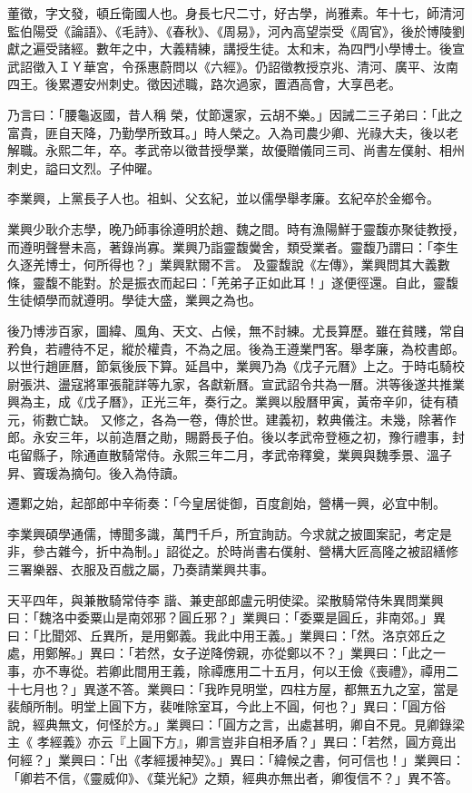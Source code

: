 \begin{pinyinscope}
 董徵，字文發，頓丘衛國人也。身長七尺二寸，好古學，尚雅素。年十七，師清河監伯陽受《論語》、《毛詩》、《春秋》、《周易》，河內高望崇受《周官》，後於博陵劉獻之遍受諸經。數年之中，大義精練，講授生徒。太和末，為四門小學博士。後宣武詔徵入ＩＹ華宮，令孫惠蔚問以《六經》。仍詔徵教授京兆、清河、廣平、汝南四王。後累遷安州刺史。徵因述職，路次過家，置酒高會，大享邑老。



 乃言曰：「腰龜返國，昔人稱
 榮，仗節還家，云胡不樂。」因誡二三子弟曰：「此之富貴，匪自天降，乃勤學所致耳。」時人榮之。入為司農少卿、光祿大夫，後以老解職。永熙二年，卒。孝武帝以徵昔授學業，故優贈儀同三司、尚書左僕射、相州刺史，謚曰文烈。子仲曜。



 李業興，上黨長子人也。祖虯、父玄紀，並以儒學舉孝廉。玄紀卒於金鄉令。



 業興少耿介志學，晚乃師事徐遵明於趙、魏之間。時有漁陽鮮于靈馥亦聚徒教授，而遵明聲譽未高，著錄尚寡。業興乃詣靈馥黌舍，類受業者。靈馥乃謂曰：「李生久逐羌博士，何所得也？」業興默爾不言。
 及靈馥說《左傳》，業興問其大義數條，靈馥不能對。於是振衣而起曰：「羌弟子正如此耳！」遂便徑還。自此，靈馥生徒傾學而就遵明。學徒大盛，業興之為也。



 後乃博涉百家，圖緯、風角、天文、占候，無不討練。尤長算歷。雖在貧賤，常自矜負，若禮待不足，縱於權貴，不為之屈。後為王遵業門客。舉孝廉，為校書郎。以世行趙匪曆，節氣後辰下算。延昌中，業興乃為《戊子元曆》上之。于時屯騎校尉張洪、盪寇將軍張龍詳等九家，各獻新曆。宣武詔令共為一曆。洪等後遂共推業興為主，成《戊子曆》，正光三年，奏行之。業興以殷曆甲寅，黃帝辛卯，徒有積元，術數亡缺。
 又修之，各為一卷，傳於世。建義初，敕典儀注。未幾，除著作郎。永安三年，以前造曆之勛，賜爵長子伯。後以孝武帝登極之初，豫行禮事，封屯留縣子，除通直散騎常侍。永熙三年二月，孝武帝釋奠，業興與魏季景、溫子昇、竇瑗為摘句。後入為侍讀。



 遷鄴之始，起部郎中辛術奏：「今皇居徙御，百度創始，營構一興，必宜中制。



 李業興碩學通儒，博聞多識，萬門千戶，所宜詢訪。今求就之披圖案記，考定是非，參古雜今，折中為制。」詔從之。於時尚書右僕射、營構大匠高隆之被詔繕修三署樂器、衣服及百戲之屬，乃奏請業興共事。



 天平四年，與兼散騎常侍李
 諧、兼吏部郎盧元明使梁。梁散騎常侍朱異問業興曰：「魏洛中委粟山是南郊邪？圓丘邪？」業興曰：「委粟是圓丘，非南郊。」異曰：「比聞郊、丘異所，是用鄭義。我此中用王義。」業興曰：「然。洛京郊丘之處，用鄭解。」異曰：「若然，女子逆降傍親，亦從鄭以不？」業興曰：「此之一事，亦不專從。若卿此間用王義，除禫應用二十五月，何以王儉《喪禮》，禫用二十七月也？」異遂不答。業興曰：「我昨見明堂，四柱方屋，都無五九之室，當是裴頠所制。明堂上圓下方，裴唯除室耳，今此上不圓，何也？」異曰：「圓方俗說，經典無文，何怪於方。」業興曰：「圓方之言，出處甚明，卿自不見。見卿錄梁主《
 孝經義》亦云『上圓下方』，卿言豈非自相矛盾？」異曰：「若然，圓方竟出何經？」業興曰：「出《孝經援神契》。」異曰：「緯候之書，何可信也！」業興曰：「卿若不信，《靈威仰》、《葉光紀》之類，經典亦無出者，卿復信不？」異不答。




\end{pinyinscope}
